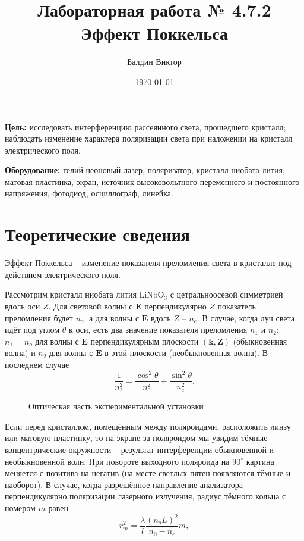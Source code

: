 \documentclass[a4paper,12pt]{article}
\title{Лабораторная работа № 4.7.2\\Эффект Поккельса}
\author{Балдин Виктор}
\date{\today}
\begin{document}
\maketitle
\newpage

\textbf{Цель:} исследовать интерференцию рассеянного света, прошедшего кристалл; наблюдать изменение характера поляризации света при наложении на кристалл электрического поля.

\textbf{Оборудование:} гелий-неоновый лазер, поляризатор, кристалл ниобата лития, матовая пластинка, экран, источник высоковольтного переменного и постоянного напряжения, фотодиод, осциллограф, линейка.

\section{Теоретические сведения}
Эффект Поккельса -- изменение показателя преломления света в кристалле под действием электрического поля.

Рассмотрим кристалл ниобата лития $\text{LiNbO}_3$ с цетральноосевой симметрией вдоль оси $Z$. Для световой волны с $\mathbf{E}$ перпендикулярно $Z$ показатель преломления будет $n_o$, а для волны с $\mathbf{E}$ вдоль $Z$ -- $n_e$. В случае, когда луч света идёт под углом $\theta$ к оси, есть два значение показателя преломления $n_1$ и $n_2$: $n_1 = n_o$ для волны с $\mathbf{E}$ перпендикулярным плоскости $(\mathbf{k},\mathbf{Z})$ (обыкновенная волна) и $n_2$ для волны с $\mathbf{E}$ в этой плоскости (необыкновенная волна). В последнем случае
\begin{equation}
\dfrac{1}{n_2^2}=\dfrac{\cos^2 \theta}{n_0^2}+\dfrac{\sin^2 \theta}{n_e^2}.
\end{equation}

\begin{figure}[h]
  \caption{\centering Оптическая часть экспериментальной установки}
	\label{fig:image1}
\end{figure}

Если перед кристаллом, помещённым между поляроидами, расположить линзу или матовую пластинку, то на экране за поляроидом мы увидим тёмные концентрические окружности -- результат интерференции обыкновенной и необыкновенной волн. При повороте выходного поляроида на $90^\circ$ картина меняется с позитива на негатив (на месте светлых пятен появляются тёмные и наоборот). В случае, когда разрешённое направление анализатора перпендикулярно поляризации лазерного излучения, радиус тёмного кольца с номером $m$ равен
\begin{equation}
r_m^2 = \dfrac{\lambda}{l} \dfrac{(n_oL)^2}{n_0 - n_e}m,
\end{equation}
\end{document}
